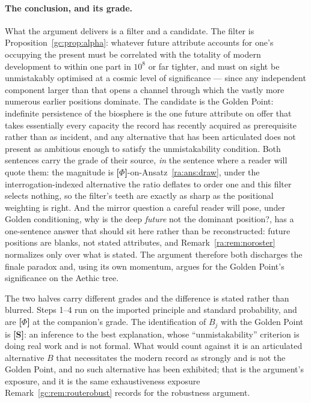 \documentclass[11pt]{article}
\numberwithin{equation}{section}
\theoremstyle{plain}
\theoremstyle{definition}
\theoremstyle{remark}
\begin{document}
\paragraph{The conclusion, and its grade.} What the argument delivers is
a filter and a candidate. The filter is
Proposition~\ref{gc:prop:alpha}: whatever future attribute accounts for
one's occupying the present must be correlated with the totality of
modern development to within one part in $10^{8}$ or far tighter, and
must on sight be unmistakably optimised at a cosmic level of
significance --- since any independent component larger than that opens
a channel through which the vastly more numerous earlier positions
dominate. The candidate is the Golden Point: indefinite persistence of
the biosphere is the one future attribute on offer that takes
essentially every capacity the record has recently acquired as
prerequisite rather than as incident, and any alternative that has been
articulated does not present as ambitious enough to satisfy the
unmistakability condition. Both sentences carry the grade of their
source, \emph{in} the sentence where a reader will quote them: the
magnitude is \textbf{[$\Phi$]}-on-Ansatz~\ref{ra:ans:draw}, under
the interrogation-indexed alternative the ratio deflates to order one
and this filter selects nothing, so the filter's teeth are exactly
as sharp as the positional weighting is right. And the mirror question
a careful reader will pose, under Golden conditioning, why is the
deep \emph{future} not the dominant position?, has a one-sentence
answer that should sit here rather than be reconstructed: future
positions are blanks, not stated attributes, and
Remark~\ref{ra:rem:noroster} normalizes only over what is stated. The argument therefore both discharges the
finale paradox and, using its own momentum, argues for the Golden
Point's significance on the Aethic tree.

The two halves carry different grades and the difference is stated
rather than blurred. Steps 1--4 run on the imported principle and
standard probability, and are \textbf{[$\Phi$]} at the companion's
grade. The identification of $B_j$ with the Golden Point is
\textbf{[S]}: an inference to the best explanation, whose
``unmistakability'' criterion is doing real work and is not formal. What
would count against it is an articulated alternative $B$ that
necessitates the modern record as strongly and is not the Golden Point,
and no such alternative has been exhibited; that is the argument's
exposure, and it is the same exhaustiveness exposure
Remark~\ref{gc:rem:routerobust} records for the robustness argument.
\end{document}
